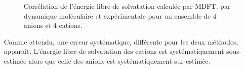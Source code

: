 \begin{figure}[ht]
\begin{subfigure}[b]{0.49\textwidth}
{}
    \end{subfigure}
  \caption[Corrélation des énergies libres de solvatation calculées par rapport aux valeurs expérimentales pour les ions.]{Corrélation de l'énergie libre de solvatation calculée par MDFT, par dynamique moléculaire et expérimentale pour un ensemble de 4 anions et 4 cations.}
  \label{fig:correlation_ions}
\end{figure}

Comme attendu, une erreur systématique, différente pour les deux méthodes, appara\^it. L'énergie libre de solvatation des cations est systématiquement sous-estimée alors que celle des anions est systématiquement sur-estimée.

\begin{figure}[ht]
   \centering
   \begin{subfigure}[b]{0.5\textwidth}
       \centering
    \end{subfigure}
   \begin{subfigure}[b]{0.49\textwidth}
       \centering
       \resizebox{\linewidth}{!}{
}
\end{subfigure}
\end{figure}

